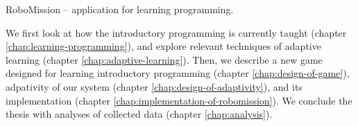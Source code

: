 %
  {RoboMission -- application for learning programming.}

We first look at how the introductory programming is currently taught
(chapter \ref{chap:learning-programming}),
and explore relevant techniques of adaptive learning (chapter \ref{chap:adaptive-learning}).
Then, we describe a new game designed for learning introductory programming
(chapter \ref{chap:design-of-game}),
adpativity of our system (chapter \ref{chap:design-of-adaptivity}),
and its implementation (chapter \ref{chap:implementation-of-robomission}).
We conclude the thesis with analyses of collected data
(chapter \ref{chap:analysis}).
